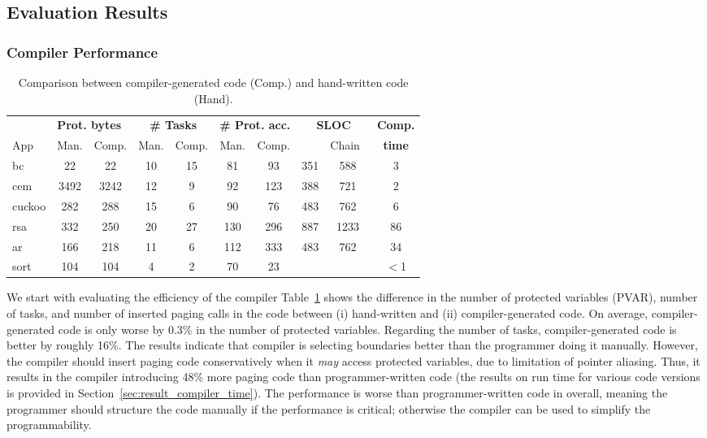 \subsection{\sys Evaluation Results}
\label{sec:results_evaluation}

\subsubsection{\sys Compiler Performance}
\label{sec:results_compiler}

\begin{table}[t]
	\centering
	\footnotesize
        \renewcommand{\tabcolsep}{1pt}
	\begin{tabular}{l|cc|cc|cc|cc|c}
		\hline
		{} & \multicolumn{2}{l|}{{\bf Prot. bytes}} & \multicolumn{2}{c|}{{\bf \# Tasks}} & \multicolumn{2}{c|}{{\bf \# Prot. acc.}} & \multicolumn{2}{c|}{\bf SLOC} & {\bf Comp.} \\
		App & Man. & Comp. & Man. & Comp. & Man. & Comp. & \multicolumn{1}{l}{\sys} & \multicolumn{1}{r|}{Chain~\cite{chain}} & {\bf time} \\
		\hline
		bc & 22 & 22 & 10 & 15 & 81 & 93 & 351 &588 & 3\\
		cem & 3492 & 3242 & 12 & 9 & 92 & 123 & 388 &721 & 2\\
		cuckoo & 282 & 288 & 15 & 6 & 90 & 76 & 483 &762 & 6\\
		rsa & 332 & 250 & 20 & 27 & 130 & 296 & 887 &1233 & 86\\
		ar & 166 & 218 & 11 & 6 & 112 & 333 & 483 &762 & 34\\
		sort & 104 & 104 & 4 & 2 & 70 & 23 & & & $<$1\\
		\hline
	\end{tabular}
	\caption{Comparison between compiler-generated \sys code (Comp.) and hand-written \sys code (Hand).}
\label{table:compiler_result}
\end{table}

We start with evaluating the efficiency of the \sys compiler Table~\ref{table:compiler_result} shows the difference in the number of protected variables (PVAR), number of tasks, and number of inserted paging calls in the code between (i) hand-written \sys and (ii) compiler-generated \sys code. On average, compiler-generated code is only worse by 0.3\% in the number of protected variables. Regarding the number of tasks, compiler-generated code is better by roughly 16\%. The results indicate that \sys compiler is selecting boundaries better than the programmer doing it manually. However, the \sys compiler should insert paging code conservatively when it {\em may} access protected variables, due to limitation of pointer aliasing. Thus, it results in the \sys compiler introducing 48\% more paging code than programmer-written code (the results on run time for various \sys code versions is provided in Section~\ref{sec:result_compiler_time}). The performance is worse than programmer-written \sys code in overall, meaning the programmer should structure the code manually if the performance is critical; otherwise the compiler can be used to simplify the programmability. 

